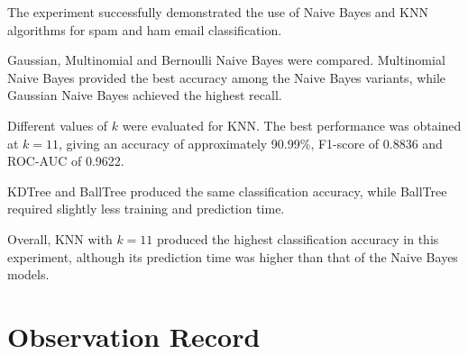\documentclass[12pt,a4paper]{article}
\begin{document}
The experiment successfully demonstrated the use of Naive Bayes and KNN algorithms for spam and ham email classification.

Gaussian, Multinomial and Bernoulli Naive Bayes were compared. Multinomial Naive Bayes provided the best accuracy among the Naive Bayes variants, while Gaussian Naive Bayes achieved the highest recall.

Different values of $k$ were evaluated for KNN. The best performance was obtained at $k=11$, giving an accuracy of approximately 90.99\%, F1-score of 0.8836 and ROC-AUC of 0.9622.

KDTree and BallTree produced the same classification accuracy, while BallTree required slightly less training and prediction time.

Overall, KNN with $k=11$ produced the highest classification accuracy in this experiment, although its prediction time was higher than that of the Naive Bayes models.


\section{Observation Record}
\end{document}
